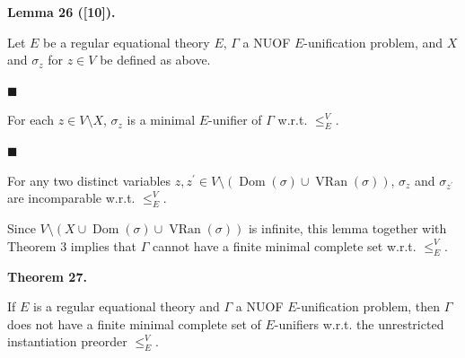  
 
\par\medskip\noindent\textbf{Lemma 26 ([10]).}\par
 
 
Let $E$ be a regular equational theory $E$, $\Gamma$ a NUOF $E$-unification problem, and $X$ and $\sigma_{z}$ for $z\in V$ be defined as above.\par
  
\par\noindent  $\blacksquare$ 
 
For each $z\in V\setminus X$, $\sigma_{z}$ is a minimal $E$-unifier of $\Gamma$ w.r.t. $\leq_{E}^{V}$.\par
 
 
 
\par\noindent  $\blacksquare$ 
 
For any two distinct variables $z,z^{\prime}\in V\setminus(\operatorname{Dom}(\sigma)\cup\operatorname{VRan}(%
\sigma))$, $\sigma_{z}$ and $\sigma_{z^{\prime}}$ are incomparable w.r.t. $\leq_{E}^{V}$.\par
 
 
  
 
 
 
Since $V\setminus(X\cup\operatorname{Dom}(\sigma)\cup\operatorname{VRan}(\sigma))$ is infinite, this lemma together with Theorem 3 implies that $\Gamma$ cannot have a finite minimal complete set w.r.t. $\leq_{E}^{V}$.\par
 
 
 
\par\medskip\noindent\textbf{Theorem 27.}\par
 
 
If $E$ is a regular equational theory and $\Gamma$ a NUOF $E$-unification problem, then $\Gamma$ does not have a finite minimal complete set of $E$-unifiers w.r.t. the unrestricted instantiation preorder $\leq_{E}^{V}$.\par
 
